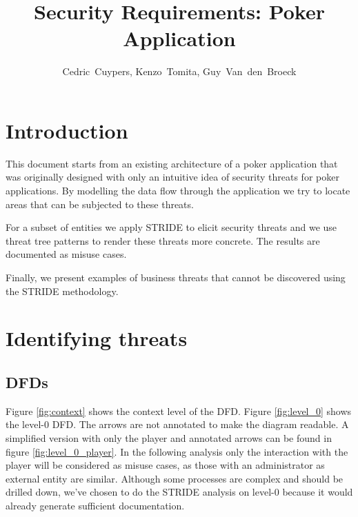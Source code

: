 \documentclass[a4paper,11pt]{report}
\author{Cedric~Cuypers, Kenzo~Tomita, Guy~Van~den~Broeck}
\title{Security Requirements: Poker Application}
\begin{document}
 
\maketitle 
\tableofcontents
 
\listoffigures

\chapter{Introduction}
This document starts from an existing architecture of a poker application that was originally designed with only an intuitive idea of security threats for poker applications. By modelling the data flow through the application we try to locate areas that can be subjected to these threats. 

For a subset of entities we apply STRIDE to elicit security threats and we use threat tree patterns to render these threats more concrete. The results are documented as misuse cases.

Finally, we present examples of business threats that cannot be discovered using the STRIDE methodology. 


\chapter{Identifying threats}
\section{DFDs}
Figure \ref{fig:context} shows the context level of the DFD. Figure \ref{fig:level_0} shows the level-0 DFD. The arrows are not annotated to make the diagram readable. A simplified version with only the player and annotated arrows can be found in figure \ref{fig:level_0_player}. In the following analysis only the interaction with the player will be considered as misuse cases, as those with an administrator as external entity are similar. Although some processes are complex and should be drilled down, we've chosen to do the STRIDE analysis on level-0 because it would already generate sufficient documentation.
\end{document}
